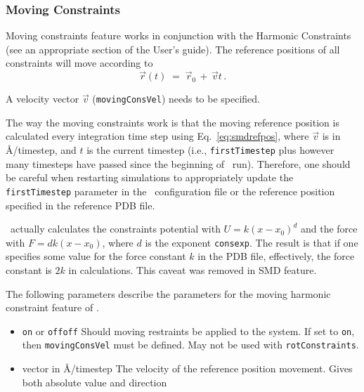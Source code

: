 \subsubsection{Moving Constraints}

Moving constraints feature works in conjunction with the Harmonic
Constraints (see an appropriate section of the User's guide).
The reference positions of all constraints
will move according to
\begin{equation}
\label{eq:smdrefpos}
   \vec r(t) \; = \; \vec r_0 \, + \, \vec v t \,.
\end{equation}

A velocity vector $\vec v$ ({\tt movingConsVel}) needs to be specified.

The way the moving constraints work is that the moving reference
position is calculated every integration time step using
Eq.~\ref{eq:smdrefpos}, where $\vec v$ is in \AA/timestep, and $t$ is the
current timestep (i.e., {\tt firstTimestep} plus however many
timesteps have passed since the beginning of \NAMD\ run). Therefore,
one should be careful when restarting simulations to appropriately
update the {\tt firstTimestep} parameter in the \NAMD\ configuration
file or the reference position specified in the reference PDB file.

 \NAMD\ actually calculates the constraints
potential with $U = k (x-x_0)^d$ and the force with $F = d k (x-x_0)$,
where $d$ is the exponent {\tt consexp}. The result is that if one
specifies some value for the force constant $k$ in the PDB file,
effectively, the force constant is $2 k$ in calculations. This caveat
was removed in SMD feature.

The following parameters describe the parameters for the
moving harmonic constraint feature of \NAMD.

\begin{itemize}

\item
{}
{{\tt on} or {\tt off}}{{\tt off}}
{Should moving restraints be applied to the system. If set
to {\tt on}, then  {\tt movingConsVel} must be defined.
May not be used with {\tt rotConstraints}.}

\item
{}
{vector in \AA/timestep}
{The velocity of the reference position movement. Gives both absolute
value and direction}

\end{itemize}

